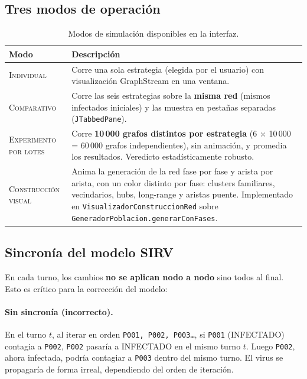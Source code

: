 \documentclass[spanish,notitlepage,letterpaper, 12pt]{article}
\begin{document}
\subsection{Tres modos de operaci\'on}

\begin{table}[H]
\centering
\caption{Modos de simulaci\'on disponibles en la interfaz.}
\label{tab:modos}
\small
\begin{tabular}{l p{10cm}}
\toprule
\textbf{Modo} & \textbf{Descripci\'on} \\
\midrule
\textsc{Individual} & Corre una sola estrategia (elegida por el usuario) con visualizaci\'on GraphStream en una ventana. \\
\textsc{Comparativo} & Corre las seis estrategias sobre la \textbf{misma red} (mismos infectados iniciales) y las muestra en pesta\~nas separadas (\texttt{JTabbedPane}). \\
\textsc{Experimento por lotes} & Corre \textbf{10\,000 grafos distintos por estrategia} (6 $\times$ 10\,000 = 60\,000 grafos independientes), sin animaci\'on, y promedia los resultados. Veredicto estad\'isticamente robusto. \\
\textsc{Construcci\'on visual} & Anima la generaci\'on de la red fase por fase y arista por arista, con un color distinto por fase: clusters familiares, vecindarios, hubs, long-range y aristas puente. Implementado en \texttt{VisualizadorConstruccionRed} sobre \texttt{GeneradorPoblacion.generarConFases}. \\
\bottomrule
\end{tabular}
\end{table}

\subsection{Sincron\'ia del modelo SIRV}
\label{sec:sincronia}

En cada turno, los cambios \textbf{no se aplican nodo a nodo} sino todos al final. Esto es cr\'itico para la correcci\'on del modelo:

\paragraph{Sin sincron\'ia (incorrecto).} En el turno $t$, al iterar en orden \texttt{P001, P002, P003\ldots}, si \texttt{P001} (INFECTADO) contagia a \texttt{P002}, \texttt{P002} pasar\'ia a INFECTADO en el mismo turno $t$. Luego \texttt{P002}, ahora infectada, podr\'ia contagiar a \texttt{P003} dentro del mismo turno. El virus se propagar\'ia de forma irreal, dependiendo del orden de iteraci\'on.
\end{document}
